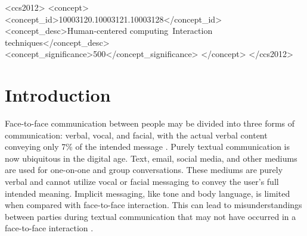 \documentclass[acmsmall,screen,authorversion,nonacm]{acmart}
\begin{document}
\begin{CCSXML}
<ccs2012>
   <concept>
       <concept_id>10003120.10003121.10003128</concept_id>
       <concept_desc>Human-centered computing~Interaction techniques</concept_desc>
       <concept_significance>500</concept_significance>
       </concept>
 </ccs2012>
\end{CCSXML}




\maketitle

\section{Introduction}

Face-to-face communication between people may be divided into three forms of communication: verbal, vocal, and facial, with the actual verbal content conveying only 7\% of the intended message \cite{in_person_comm_breakdown}. Purely textual communication is now ubiquitous in the digital age. Text, email, social media, and other mediums are used for one-on-one and group conversations. These mediums are purely verbal and cannot utilize vocal or facial messaging to convey the user's full intended meaning. Implicit messaging, like tone and body language, is limited when compared with face-to-face interaction. This can lead to misunderstandings between parties during textual communication that may not have occurred in a face-to-face interaction \cite{Kelly_Miller-Ott_2018}. 
\end{document}
